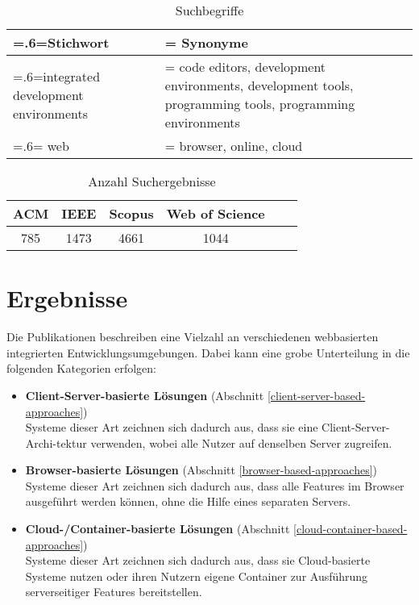 \begin{table}[tbp]
    \centering
    \begin{tabularx}{\textwidth}{| >{\hsize=.6\hsize\linewidth=\hsize}X |
            >{\hsize=1.4\hsize\linewidth=\hsize}X |}
        \hline
        Stichwort                           & Synonyme                                                                                               \\
        \hline
        integrated development environments & code editors, development environments, development tools, programming tools, programming environments \\
        \hline
        web                                 & browser, online, cloud                                                                                 \\
        \hline
    \end{tabularx}
    \caption{Suchbegriffe}
    \label{table:search-terms}
\end{table}


\begin{table}[tbp]
    \centering
    \begin{tabular}{|c|c|c|c|c|c|}
        \hline
        ACM & IEEE & Scopus & Web of Science \\
        \hline
        785 & 1473 & 4661   & 1044           \\
        \hline
    \end{tabular}
    \caption{Anzahl Suchergebnisse}
    \label{table:amount-search-results}
\end{table}

\section{Ergebnisse}

Die Publikationen beschreiben eine Vielzahl an verschiedenen webbasierten integrierten Entwicklungsumgebungen. Dabei kann eine grobe Unterteilung in die folgenden Kategorien erfolgen:

\begin{itemize}
    \item \textbf{Client-Server-basierte Lösungen} \hfill (Abschnitt \ref{client-server-based-approaches}) \\
          Systeme dieser Art zeichnen sich dadurch aus, dass sie eine Client-Server-Archi-tektur verwenden, wobei alle Nutzer auf denselben Server zugreifen.
    \item \textbf{Browser-basierte Lösungen} \hfill (Abschnitt \ref{browser-based-approaches}) \\
          Systeme dieser Art zeichnen sich dadurch aus, dass alle Features im Browser ausgeführt werden können, ohne die Hilfe eines separaten Servers.
    \item \textbf{Cloud-/Container-basierte Lösungen} \hfill (Abschnitt \ref{cloud-container-based-approaches}) \\
          Systeme dieser Art zeichnen sich dadurch aus, dass sie Cloud-basierte Systeme nutzen oder ihren Nutzern eigene Container zur Ausführung serverseitiger Features bereitstellen.
\end{itemize}

